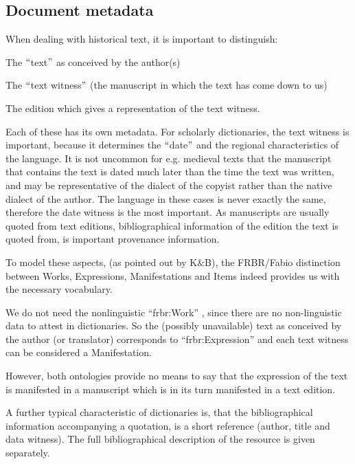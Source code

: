 \documentclass[10pt]{article}
\let\tempone\itemize
\let\temptwo\enditemize
\renewenvironment{itemize}{\tempone\setlength\itemsep{-0.5pt}}{\temptwo}
\begin{document}
\subsection{Document metadata }
\label{ssec:witness}

When dealing with historical text, it is important to distinguish:


\begin{itemize}
\item The $``$text$"$ as conceived by the author(s)

\item The $``$text witness$"$  (the manuscript in which the text has come down to us)

\item The edition which gives a representation of the text witness.
\end{itemize}


 Each of these has its own metadata. For scholarly dictionaries, the text witness is important, because it determines the $``$date$"$  and the regional characteristics of the language. It is not uncommon for e.g. medieval texts that the manuscript that contains the text is dated much later than the time the text was written, and may be representative of the dialect of the copyist rather than the native dialect of the author. The language in these cases is never exactly the same, therefore the date witness is the most important. As manuscripts are usually quoted from text editions, bibliographical information of the edition the text is quoted from, is important provenance information.

To model these aspects, (as pointed out by K$\&$B), the FRBR/Fabio distinction between Works, Expressions, Manifestations and Items indeed provides us with the necessary vocabulary.
 
 We do not need the nonlinguistic ``frbr:Work'' , since there are no non-linguistic data to attest in dictionaries. So the (possibly unavailable) text as conceived by the author (or translator) corresponds to ``frbr:Expression'' and each text witness can be  considered a Manifestation.  
 
 However, both ontologies provide no means to say that the expression of the text is manifested in a manuscript which is in its turn manifested in a text edition.\par

 A further typical characteristic of dictionaries is, that the bibliographical information accompanying a quotation, is a short reference (author, title and data witness). The full bibliographical description of the resource is given separately.\par
\end{document}
